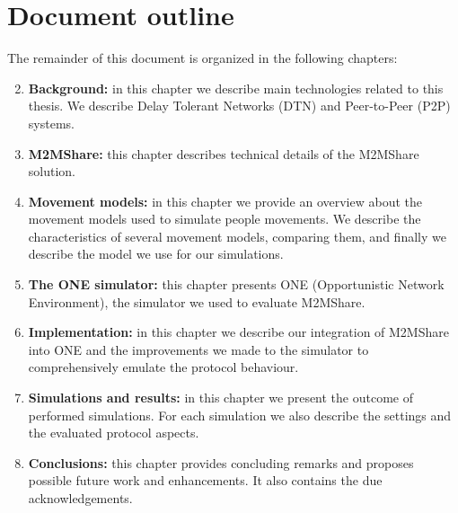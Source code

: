 \section{Document outline}
The remainder of this document is organized in the following chapters:
\begin{enumerate}
\setcounter{enumi}{1}
\item \textbf{Background:} in this chapter we describe main technologies related to this thesis. We describe Delay Tolerant Networks (DTN) and Peer-to-Peer (P2P) systems.
\item \textbf{M2MShare:} this chapter describes technical details of the M2MShare solution.
\item \textbf{Movement models:} in this chapter we provide an overview about the movement models used to simulate people movements. We describe the characteristics of several movement models, comparing them, and finally we describe the model we use for our simulations.
\item \textbf{The ONE simulator:} this chapter presents ONE (Opportunistic Network Environment), the simulator we used to evaluate M2MShare.
\item \textbf{Implementation:} in this chapter we describe our integration of M2MShare into ONE and the improvements we made to the simulator to comprehensively emulate the protocol behaviour.
\item \textbf{Simulations and results:} in this chapter we present the outcome of performed simulations. For each simulation we also describe the settings and the evaluated protocol aspects.
\item \textbf{Conclusions:}  this chapter provides concluding remarks and proposes possible future work and enhancements. It also contains the due acknowledgements.

\end{enumerate}
 

